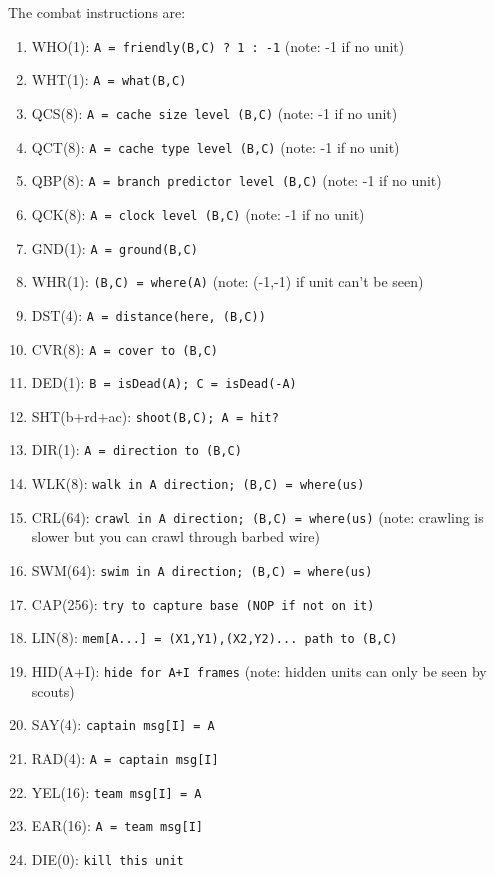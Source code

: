 \documentclass{article}
\begin{document}
The combat instructions are:

\begin{enumerate}[noitemsep]
    \item WHO(1): \texttt{A = friendly(B,C) ? 1 : -1} (note: -1 if no unit)
    \item WHT(1): \texttt{A = what(B,C)}
    \item QCS(8): \texttt{A = cache size level (B,C)} (note: -1 if no unit)
    \item QCT(8): \texttt{A = cache type level (B,C)} (note: -1 if no unit)
    \item QBP(8): \texttt{A = branch predictor level (B,C)} (note: -1 if no unit)
    \item QCK(8): \texttt{A = clock level (B,C)} (note: -1 if no unit)
    \item GND(1): \texttt{A = ground(B,C)}
    \item WHR(1): \texttt{(B,C) = where(A)} (note: (-1,-1) if unit can't be seen)
    \item DST(4): \texttt{A = distance(here, (B,C))}
    \item CVR(8): \texttt{A = cover to (B,C)}
    \item DED(1): \texttt{B = isDead(A); C = isDead(-A)}
    \item SHT(b+rd+ac): \texttt{shoot(B,C); A = hit?}
    \item DIR(1): \texttt{A = direction to (B,C)}
    \item WLK(8): \texttt{walk in A direction; (B,C) = where(us)}
    \item CRL(64): \texttt{crawl in A direction; (B,C) = where(us)} (note:
        crawling is slower but you can crawl through barbed wire)
    \item SWM(64): \texttt{swim in A direction; (B,C) = where(us)}
    \item CAP(256): \texttt{try to capture base (NOP if not on it)}
    \item LIN(8): \texttt{mem[A...] = (X1,Y1),(X2,Y2)... path to (B,C)}
    \item HID(A+I): \texttt{hide for A+I frames} (note: hidden units can only be
        seen by scouts)
    \item SAY(4): \texttt{captain msg[I] = A}
    \item RAD(4): \texttt{A = captain msg[I]}
    \item YEL(16): \texttt{team msg[I] = A}
    \item EAR(16): \texttt{A = team msg[I]}
    \item DIE(0): \texttt{kill this unit}

\end{enumerate}
\end{document}
